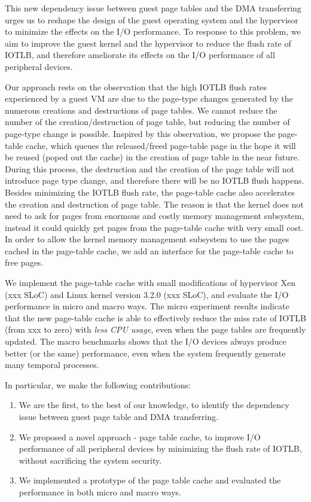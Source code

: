 
This new dependency issue between guest page tables and the DMA transferring urges us to reshape the design of the guest operating system and the hypervisor to minimize the effects on the I/O performance.
To response to this problem, we aim to improve the guest kernel and the hypervisor to reduce the flush rate of IOTLB, and therefore ameliorate its effects on the I/O performance of all peripheral devices.

Our approach rests on the observation that the high IOTLB flush rates experienced by a guest VM
are due to the page-type changes generated by the numerous creations and destructions of page tables.
We cannot reduce the number of the creation/destruction of page table, but reducing the number of page-type change is possible.
Inspired by this observation, we propose the page-table cache, which queues the released/freed page-table page in the hope
it will be reused (poped out the cache) in the creation of page table in the near future.
During this process, the destruction and the creation of the page table will not introduce page type change, and therefore there will be no IOTLB flush happens.
Besides minimizing the IOTLB flush rate, the page-table cache also accelerates the creation and destruction of page table.
The reason is that the kernel does not need to ask for pages from enormous and costly memory management subsystem, instead it could quickly get pages from the page-table cache with very small cost.
In order to allow the kernel memory management subsystem to use the pages cached in the page-table cache, we add an interface for the page-table cache to free pages.

We implement the page-table cache with small modifications of hypervisor Xen (xxx SLoC)  and Linux kernel version 3.2.0 (xxx SLoC), and evaluate the I/O performance in micro and macro ways.
The micro experiment results indicate that the new page-table cache is able to effectively reduce the miss rate of IOTLB (from xxx to zero) with \emph{less CPU usage}, even when the page tables are frequently updated.
The macro benchmarks shows that the I/O devices always produce better (or the same) performance, even when the system frequently generate many temporal processes.


In particular, we make the following contributions:
\begin{enumerate}
\item We are the first, to the best of our knowledge, to identify the dependency issue between guest page table and DMA transferring.
\item We proposed a novel approach - page table cache, to improve I/O performance of all peripheral devices by minimizing the flush rate of IOTLB, without sacrificing the system security.
\item We implemented a prototype of the page table cache and evaluated the performance in both micro and macro ways.
\end{enumerate}

